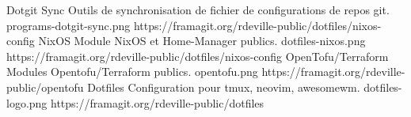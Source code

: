 \project
{Dotgit Sync}
{Outils de synchronisation de fichier de configurations de repos git.}
{programs-dotgit-sync.png}
{https://framagit.org/rdeville-public/dotfiles/nixos-config}
\project%
{NixOS}%
{Module NixOS et Home-Manager publics.}%
{dotfiles-nixos.png}%
{https://framagit.org/rdeville-public/dotfiles/nixos-config}
\project%
{OpenTofu/Terraform}%
{Modules Opentofu/Terraform publics.}%
{opentofu.png}%
{https://framagit.org/rdeville-public/opentofu}
\project%
{Dotfiles}%
{Configuration pour tmux, neovim, awesomewm.}%
{dotfiles-logo.png}%
{https://framagit.org/rdeville-public/dotfiles}
